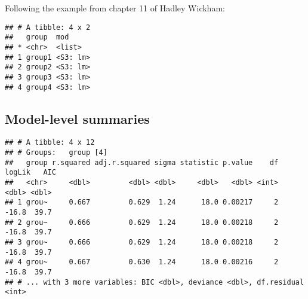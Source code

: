 \documentclass[]{book}
\newenvironment{Shaded}{\begin{snugshade}}{\end{snugshade}}
\newcommand{\DataTypeTok}[1]{\textcolor[rgb]{0.13,0.29,0.53}{#1}}
\newcommand{\KeywordTok}[1]{\textcolor[rgb]{0.13,0.29,0.53}{\textbf{#1}}}
\newcommand{\NormalTok}[1]{#1}
\newcommand{\OperatorTok}[1]{\textcolor[rgb]{0.81,0.36,0.00}{\textbf{#1}}}
\newcommand{\StringTok}[1]{\textcolor[rgb]{0.31,0.60,0.02}{#1}}
\theoremstyle{definition}
\theoremstyle{definition}
\theoremstyle{definition}
\theoremstyle{remark}
\begin{document}
Following the example from chapter 11 of Hadley Wickham:

\begin{Shaded}
\end{Shaded}

\begin{verbatim}
## # A tibble: 4 x 2
##   group  mod     
## * <chr>  <list>  
## 1 group1 <S3: lm>
## 2 group2 <S3: lm>
## 3 group3 <S3: lm>
## 4 group4 <S3: lm>
\end{verbatim}

\hypertarget{model-level-summaries}{%
\subsection{Model-level summaries}\label{model-level-summaries}}

\begin{Shaded}
\end{Shaded}

\begin{verbatim}
## # A tibble: 4 x 12
## # Groups:   group [4]
##   group r.squared adj.r.squared sigma statistic p.value    df logLik   AIC
##   <chr>     <dbl>         <dbl> <dbl>     <dbl>   <dbl> <int>  <dbl> <dbl>
## 1 grou~     0.667         0.629  1.24      18.0 0.00217     2  -16.8  39.7
## 2 grou~     0.666         0.629  1.24      18.0 0.00218     2  -16.8  39.7
## 3 grou~     0.666         0.629  1.24      18.0 0.00218     2  -16.8  39.7
## 4 grou~     0.667         0.630  1.24      18.0 0.00216     2  -16.8  39.7
## # ... with 3 more variables: BIC <dbl>, deviance <dbl>, df.residual <int>
\end{verbatim}
\end{document}
